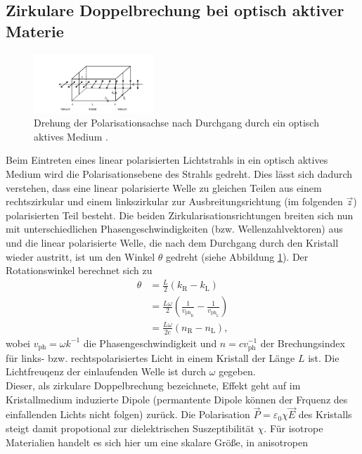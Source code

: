 \subsection{Zirkulare Doppelbrechung bei optisch aktiver Materie}
\begin{figure}[H]
  \center
  \includegraphics[width=0.4\textwidth]{Bilder/Kristall.jpg}
  \caption{Drehung der Polarisationsachse nach Durchgang durch ein optisch
  aktives Medium \cite{Anleitung}.}
  \label{T_Abb:2}
\end{figure}
Beim Eintreten eines linear polarisierten Lichtstrahls in ein optisch aktives Medium
wird die Polarisationsebene des Strahls gedreht. Dies lässt sich dadurch verstehen,
dass eine linear polarisierte Welle zu gleichen Teilen aus einem rechtszirkular und
einem linkszirkular zur Ausbreitungsrichtung (im folgenden $\vec{z}$) polarisierten
Teil besteht. Die beiden Zirkularisationsrichtungen breiten sich nun mit unterschiedlichen
Phasengeschwindigkeiten (bzw. Wellenzahlvektoren) aus und die linear polarisierte
Welle, die nach dem Durchgang durch den Kristall wieder austritt, ist um den Winkel $\theta$
gedreht (siehe Abbildung \ref{T_Abb:2}). Der Rotationswinkel berechnet sich zu
\begin{align*}
    \theta &=\frac{L}{2} \left(k_{\text{R}}-k_{\text{L}}\right)\\
          &=\frac{L\omega}{2}\left(\frac{1}{v_{\text{ph}_{\text{R}}}}-\frac{1}{v_{\text{ph}_{\text{L}}}}\right)\\
          &=\frac{L\omega}{2\text{c}}\left(n_{\text{R}}-n_{\text{L}}\right),
\end{align*}
wobei $v_{\text{ph}}=\omega k^{-1}$ die Phasengeschwindigkeit und $n=c v_{\text{ph}}^{-1}$
der Brechungsindex für links- bzw. rechtspolarisiertes Licht in einem Kristall der
Länge $L$ ist. Die Lichtfreuqenz der einlaufenden Welle ist durch $\omega$ gegeben.\\
Dieser, als zirkulare Doppelbrechung bezeichnete, Effekt geht auf im Kristallmedium induzierte
Dipole (permantente Dipole können der Frquenz des einfallenden Lichts nicht folgen) zurück.
Die Polarisation $\vec{P} = \varepsilon_0 \chi \vec{E}$ des Kristalls
steigt damit propotional zur dielektrischen Suszeptibilität
$\chi$. Für isotrope Materialien handelt es sich hier um eine skalare Größe, in anisotropen

